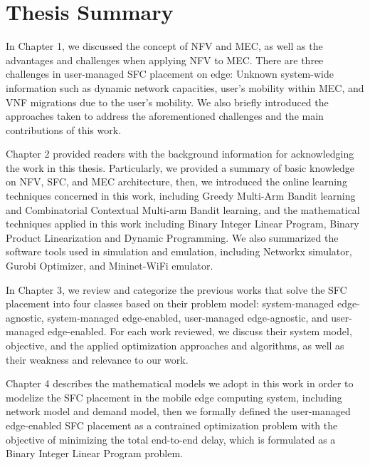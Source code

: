 \section{Thesis Summary}
\label{section: thesis summary}
In Chapter 1, we discussed the concept of NFV and MEC, as well as the advantages and challenges when applying NFV to MEC. There are three challenges in user-managed SFC placement on edge: Unknown system-wide information such as dynamic network capacities, user's mobility within MEC, and VNF migrations due to the user's mobility.  We also briefly introduced the approaches taken to address the aforementioned challenges and the main contributions of this work.

Chapter 2 provided readers with the background information for acknowledging the work in this thesis. Particularly, we provided a summary of basic knowledge on NFV, SFC, and MEC architecture, then, we introduced the online learning techniques concerned in this work, including Greedy Multi-Arm Bandit learning and Combinatorial Contextual Multi-arm Bandit learning, and the mathematical techniques applied in this work including Binary Integer Linear Program, Binary Product Linearization and Dynamic Programming. We also summarized the software tools used in simulation and emulation, including Networkx simulator, Gurobi Optimizer, and Mininet-WiFi emulator.

In Chapter 3, we review and categorize the previous works that solve the SFC placement into four classes based on their problem model: system-managed edge-agnostic, system-managed edge-enabled, user-managed edge-agnostic, and user-managed edge-enabled. For each work reviewed, we discuss their system model, objective, and the applied optimization approaches and algorithms, as well as their weakness and relevance to our work.

Chapter 4 describes the mathematical models we adopt in this work in order to modelize the SFC placement in the mobile edge computing system,  including network model and demand model, then we formally defined the user-managed edge-enabled SFC placement as a contrained optimization problem with the objective of minimizing the total end-to-end delay, which is formulated as a Binary Integer Linear Program problem. 

